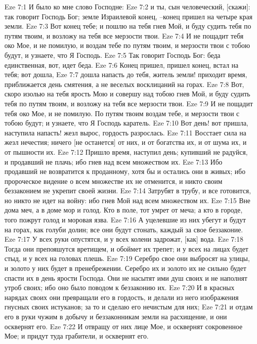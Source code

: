 Eze 7:1  И было ко мне слово Господне:
Eze 7:2  и ты, сын человеческий, [скажи]: так говорит Господь Бог; земле Израилевой конец, --конец пришел на четыре края земли.
Eze 7:3  Вот конец тебе; и пошлю на тебя гнев Мой, и буду судить тебя по путям твоим, и возложу на тебя все мерзости твои.
Eze 7:4  И не пощадит тебя око Мое, и не помилую, и воздам тебе по путям твоим, и мерзости твои с тобою будут, и узнаете, что Я Господь.
Eze 7:5  Так говорит Господь Бог: беда единственная, вот, идет беда.
Eze 7:6  Конец пришел, пришел конец, встал на тебя; вот дошла,
Eze 7:7  дошла напасть до тебя, житель земли! приходит время, приближается день смятения, а не веселых восклицаний на горах.
Eze 7:8  Вот, скоро изолью на тебя ярость Мою и совершу над тобою гнев Мой, и буду судить тебя по путям твоим, и возложу на тебя все мерзости твои.
Eze 7:9  И не пощадит тебя око Мое, и не помилую. По путям твоим воздам тебе, и мерзости твои с тобою будут; и узнаете, что Я Господь каратель.
Eze 7:10  Вот день! вот пришла, наступила напасть! жезл вырос, гордость разрослась.
Eze 7:11  Восстает сила на жезл нечестия; ничего [не останется] от них, и от богатства их, и от шума их, и от пышности их.
Eze 7:12  Пришло время, наступил день; купивший не радуйся, и продавший не плачь; ибо гнев над всем множеством их.
Eze 7:13  Ибо продавший не возвратится к проданному, хотя бы и остались они в живых; ибо пророческое видение о всем множестве их не отменится, и никто своим беззаконием не укрепит своей жизни.
Eze 7:14  Затрубят в трубу, и все готовится, но никто не идет на войну: ибо гнев Мой над всем множеством их.
Eze 7:15  Вне дома меч, а в доме мор и голод. Кто в поле, тот умрет от меча; а кто в городе, того пожрут голод и моровая язва.
Eze 7:16  А уцелевшие из них убегут и будут на горах, как голуби долин; все они будут стонать, каждый за свое беззаконие.
Eze 7:17  У всех руки опустятся, и у всех колени задрожат, [как] вода.
Eze 7:18  Тогда они препояшутся вретищем, и обоймет их трепет; и у всех на лицах будет стыд, и у всех на головах плешь.
Eze 7:19  Серебро свое они выбросят на улицы, и золото у них будет в пренебрежении. Серебро их и золото их не сильно будет спасти их в день ярости Господа. Они не насытят ими душ своих и не наполнят утроб своих; ибо оно было поводом к беззаконию их.
Eze 7:20  И в красных нарядах своих они превращали его в гордость, и делали из него изображения гнусных своих истуканов; за то и сделаю его нечистым для них;
Eze 7:21  и отдам его в руки чужим в добычу и беззаконникам земли на расхищение, и они осквернят его.
Eze 7:22  И отвращу от них лице Мое, и осквернят сокровенное Мое; и придут туда грабители, и осквернят его.
